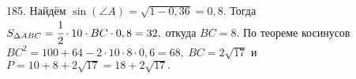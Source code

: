 185. Найдём $\sin(\angle A)=\sqrt{1-0,36}=0,8.$ Тогда $S_{\Delta ABC}=\cfrac{1}{2}\cdot10\cdot BC\cdot0,8=32,$ откуда $BC=8.$ По теореме косинусов $BC^2=100+64-2\cdot10\cdot8\cdot0,6=68,\ BC=2\sqrt{17}$ и $P=10+8+2\sqrt{17}=18+2\sqrt{17}.$\\
